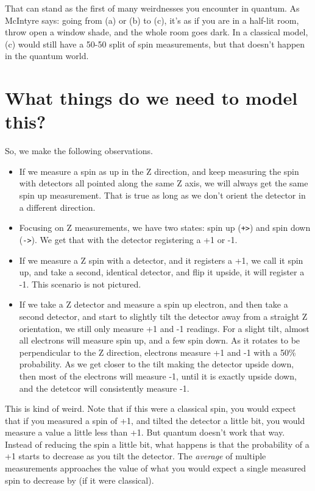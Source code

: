 \documentclass[
]{book}
\providecommand{\tightlist}{%
  \setlength{\itemsep}{0pt}\setlength{\parskip}{0pt}}
\begin{document}
That can stand as the first of many weirdnesses you encounter in quantum. As McIntyre says: going from (a) or (b) to (c), it's as if you are in a half-lit room, throw open a window shade, and the whole room goes dark. In a classical model, (c) would still have a 50-50 split of spin measurements, but that doesn't happen in the quantum world.

\hypertarget{what-things-do-we-need-to-model-this}{%
\section{What things do we need to model this?}\label{what-things-do-we-need-to-model-this}}

So, we make the following observations.

\begin{itemize}
\tightlist
\item
  If we measure a spin as up in the Z direction, and keep measuring the spin with detectors all pointed along the same Z axis, we will always get the same spin up measurement. That is true as long as we don't orient the detector in a different direction.
\item
  Focusing on Z measurements, we have two states: spin up (\texttt{\textbar{}+\textgreater{}}) and spin down (\texttt{\textbar{}-\textgreater{}}). We get that with the detector registering a +1 or -1.
\item
  If we measure a Z spin with a detector, and it registers a +1, we call it spin up, and take a second, identical detector, and flip it upside, it will register a -1. This scenario is not pictured.
\item
  If we take a Z detector and measure a spin up electron, and then take a second detector, and start to slightly tilt the detector away from a straight Z orientation, we still only measure +1 and -1 readings. For a slight tilt, almost all electrons will measure spin up, and a few spin down. As it rotates to be perpendicular to the Z direction, electrons measure +1 and -1 with a 50\% probability. As we get closer to the tilt making the detector upside down, then most of the electrons will measure -1, until it is exactly upside down, and the detetcor will consistently measure -1.
\end{itemize}

This is kind of weird. Note that if this were a classical spin, you would expect that if you measured a spin of +1, and tilted the detector a little bit, you would measure a value a little less than +1. But quantum doesn't work that way. Instead of reducing the spin a little bit, what happens is that the probability of a +1 starts to decrease as you tilt the detector. The \emph{average} of multiple measurements approaches the value of what you would expect a single measured spin to decrease by (if it were classical).
\end{document}
